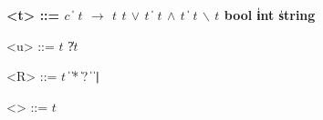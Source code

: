 \begin{grammar}
  \bfseries
  <t> ::= $c$ \| $t$ $\bm{\rightarrow}$ $t$
    \alt $t$ $\bm{\vee}$ $t$ \| $t$ $\bm{\wedge}$ $t$ \| $t$ $\bm{\backslash}$ $t$
    \alt [\meta{R}]
    \alt bool \| int \| string

  <u> ::= $t$ \| ?$t$

  <R> ::= $t$ \|  \| * \| ?
    \|   \| \texttt{|}

  <\τ> ::= $t$ %
\end{grammar}
